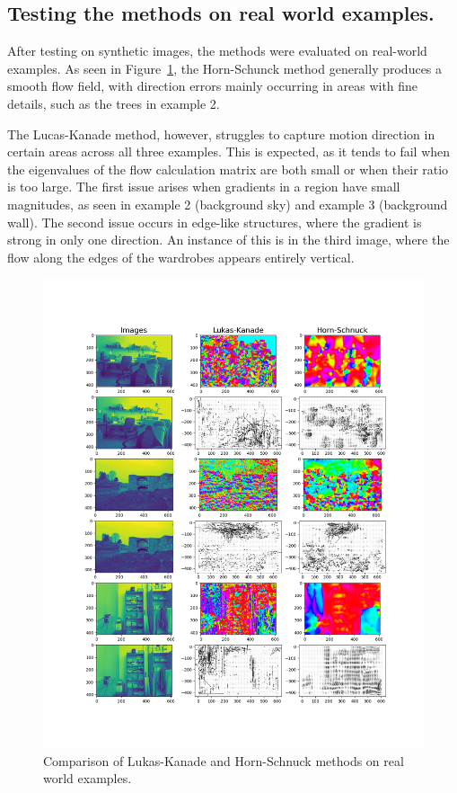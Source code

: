 \documentclass[9pt]{IEEEtran}
\begin{document}
\subsection{Testing the methods on real world examples.}

After testing on synthetic images, the methods were evaluated on real-world examples. As seen in 
Figure~\ref{fig:images}, the Horn-Schunck method generally produces a smooth flow field, with 
direction errors mainly occurring in areas with fine details, such as the trees in example 2.

The Lucas-Kanade method, however, struggles to capture motion direction in certain areas across all
 three examples. This is expected, as it tends to fail when the eigenvalues of the flow calculation
  matrix are both small or when their ratio is too large. The first issue arises when gradients in a 
  region have small magnitudes, as seen in example 2 (background sky) and example 3 (background wall). 
  The second issue occurs in edge-like structures, where the gradient is strong in only one direction. 
  An instance of this is in the third image, where the flow along the edges of the wardrobes appears
   entirely vertical.

 \begin{figure}[h]
    \centering
    \includegraphics[width=1\columnwidth]{figures/images_base.png}
    \caption{Comparison of Lukas-Kanade and Horn-Schnuck methods on real world examples.}
    \label{fig:images}
\end{figure}
\end{document}
